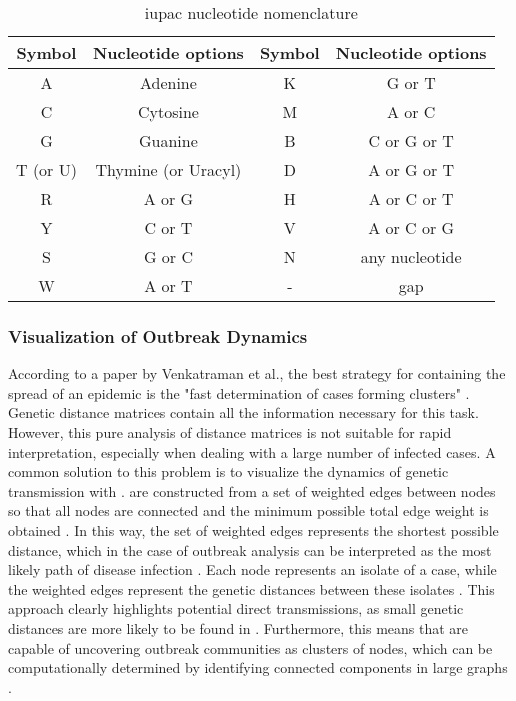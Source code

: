 \begin{table}[ht!]
    \caption[\acrshort{iupac} nucleotide nomenclature]{\acrshort{iupac} nucleotide nomenclature \cite{Iup1}}
    \centering
    \begin{tabular}{|c|c||c|c|} 
    \hline
    Symbol & Nucleotide options & Symbol & Nucleotide options \\
    \hline
    \hline
    A & Adenine & K & G or T \\
    \hline
    C & Cytosine & M & A or C \\
    \hline
    G & Guanine & B & C or G or T \\
    \hline
    T (or U) & Thymine (or Uracyl) & D & A or G or T \\
    \hline
    R & A or G & H & A or C or T \\
    \hline
    Y & C or T & V & A or C or G \\
    \hline
    S & G or C & N & any nucleotide \\
    \hline
    W & A or T & - & gap \\
    \hline
    \end{tabular}
    \label{table:iupac_nulceotide_nomenclature}
\end{table}

\subsubsection{Visualization of Outbreak Dynamics}
\label{sec:visualization_of_viral_outbreak_dynamics}
According to a paper by Venkatraman et al., the best strategy for containing the spread of an epidemic is the "fast determination of cases forming clusters" \cite{Ven1}. Genetic distance matrices contain all the information necessary for this task. However, this pure analysis of distance matrices is not suitable for rapid interpretation, especially when dealing with a large number of infected cases. A common solution to this problem is to visualize the dynamics of genetic transmission with  \cite{Sal2}.  are constructed from a set of weighted edges between nodes so that all nodes are connected and the minimum possible total edge weight is obtained \cite{Neu1}. In this way, the set of weighted edges represents the shortest possible distance, which in the case of outbreak analysis can be interpreted as the most likely path of disease infection \cite{Sal2}. Each node represents an isolate of a case, while the weighted edges represent the genetic distances between these isolates \cite{Sal2, Ven1}.
This approach clearly highlights potential direct transmissions, as small genetic distances are more likely to be found in . Furthermore, this means that  are capable of uncovering outbreak communities as clusters of nodes, which can be computationally determined by identifying connected components in large graphs \cite{Liu1}.


